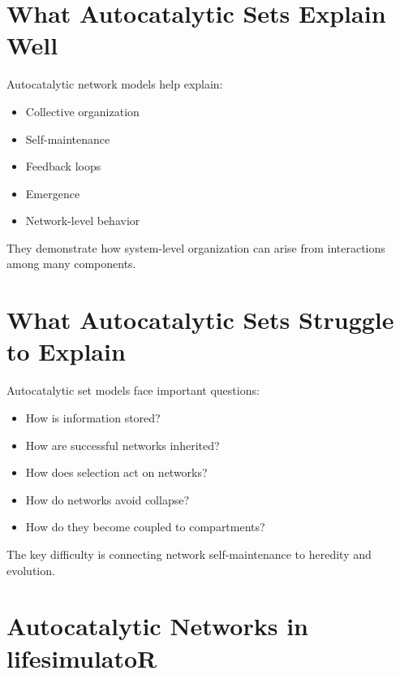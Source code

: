 \documentclass[
  oneside,
  openany]{book}
\newenvironment{Shaded}{\begin{snugshade}}{\end{snugshade}}
\newcommand{\AttributeTok}[1]{\textcolor[rgb]{0.13,0.29,0.53}{#1}}
\newcommand{\DecValTok}[1]{\textcolor[rgb]{0.00,0.00,0.81}{#1}}
\newcommand{\FloatTok}[1]{\textcolor[rgb]{0.00,0.00,0.81}{#1}}
\newcommand{\FunctionTok}[1]{\textcolor[rgb]{0.13,0.29,0.53}{\textbf{#1}}}
\newcommand{\NormalTok}[1]{#1}
\newcommand{\OtherTok}[1]{\textcolor[rgb]{0.56,0.35,0.01}{#1}}
\newcommand{\SpecialCharTok}[1]{\textcolor[rgb]{0.81,0.36,0.00}{\textbf{#1}}}
\providecommand{\tightlist}{%
  \setlength{\itemsep}{0pt}\setlength{\parskip}{0pt}}
\begin{document}
\section{What Autocatalytic Sets Explain Well}\label{what-autocatalytic-sets-explain-well}

Autocatalytic network models help explain:

\begin{itemize}
\tightlist
\item
  Collective organization
\item
  Self-maintenance
\item
  Feedback loops
\item
  Emergence
\item
  Network-level behavior
\end{itemize}

They demonstrate how system-level organization can arise from interactions among many components.

\section{What Autocatalytic Sets Struggle to Explain}\label{what-autocatalytic-sets-struggle-to-explain}

Autocatalytic set models face important questions:

\begin{itemize}
\tightlist
\item
  How is information stored?
\item
  How are successful networks inherited?
\item
  How does selection act on networks?
\item
  How do networks avoid collapse?
\item
  How do they become coupled to compartments?
\end{itemize}

The key difficulty is connecting network self-maintenance to heredity and evolution.

\section{Autocatalytic Networks in lifesimulatoR}\label{autocatalytic-networks-in-lifesimulator}

\begin{Shaded}
\end{Shaded}
\end{document}
